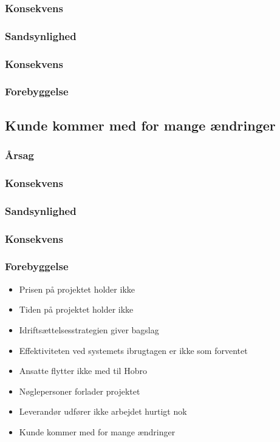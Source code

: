 \documentclass[10pt,a4paper,danish]{article}
\begin{document}
\subsubsection{Konsekvens}


\subsubsection{Sandsynlighed}


\subsubsection{Konsekvens}


\subsubsection{Forebyggelse}


\subsection{Kunde kommer med for mange ændringer}
\subsubsection{Årsag}


\subsubsection{Konsekvens}


\subsubsection{Sandsynlighed}


\subsubsection{Konsekvens}


\subsubsection{Forebyggelse}


\begin{itemize}
\item Prisen på projektet holder ikke
\item Tiden på projektet holder ikke
\item Idriftsættelsesstrategien giver bagslag
\item Effektiviteten ved systemets ibrugtagen er ikke som forventet
\item Ansatte flytter ikke med til Hobro 
\item Nøglepersoner forlader projektet
\item Leverandør udfører ikke arbejdet hurtigt nok
\item Kunde kommer med for mange ændringer
\end{itemize}
\end{document}
